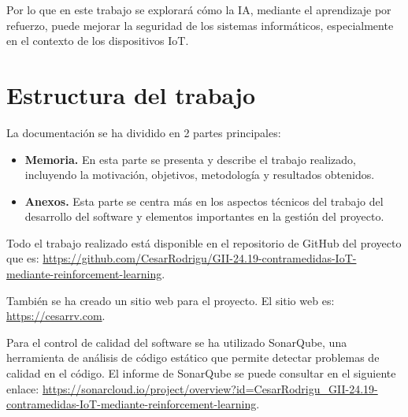 Por lo que en este trabajo se explorará cómo la IA, mediante el aprendizaje por refuerzo, puede mejorar la seguridad de los sistemas informáticos, especialmente en el contexto de los dispositivos IoT.

\section{Estructura del trabajo}
La documentación se ha dividido en 2 partes principales:
\begin{itemize}
    \item \textbf{Memoria.} En esta parte se presenta y describe el trabajo realizado, incluyendo la motivación, objetivos, metodología y resultados obtenidos.
    \item \textbf{Anexos.} Esta parte se centra más en los aspectos técnicos del trabajo del desarrollo del software y elementos importantes en la gestión del proyecto.
\end{itemize}

Todo el trabajo realizado está disponible en el repositorio de GitHub del proyecto que es: \url{https://github.com/CesarRodrigu/GII-24.19-contramedidas-IoT-mediante-reinforcement-learning}. 

También se ha creado un sitio web para el proyecto. El sitio web es: \url{https://cesarrv.com}.

Para el control de calidad del software se ha utilizado SonarQube, una herramienta de análisis de código estático que permite detectar problemas de calidad en el código. El informe de SonarQube se puede consultar en el siguiente enlace: \url{https://sonarcloud.io/project/overview?id=CesarRodrigu_GII-24.19-contramedidas-IoT-mediante-reinforcement-learning}.